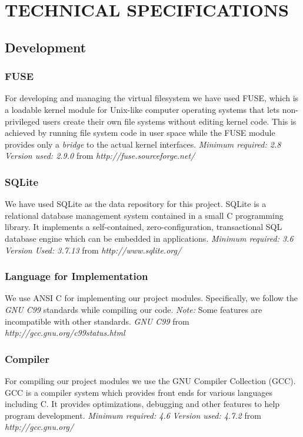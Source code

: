 \chapter {TECHNICAL SPECIFICATIONS}
\section {Development}
\subsection {FUSE}
For developing and managing the virtual filesystem we have used FUSE, which is a loadable kernel module for Unix-like computer operating systems that lets non-privileged users create their own file systems without editing kernel code. This is achieved by running file system code in user space while the FUSE module provides only a \textit{bridge} to the actual kernel interfaces. \newline
\emph{Minimum required: 2.8} \newline
\emph{Version used: 2.9.0} from \emph{http://fuse.sourceforge.net/}

\subsection {SQLite}
We have used SQLite as the data repository for this project. SQLite is a relational database management system contained in a small C programming library. It implements a self-contained, zero-configuration, transactional SQL database engine which can be embedded in applications. \newline
\emph{Minimum required: 3.6} \newline
\emph{Version Used: 3.7.13} from \emph{http://www.sqlite.org/}

\subsection {Language for Implementation}
We use ANSI C for implementing our project modules. Specifically, we follow the \textit{GNU C99} standards while compiling our code. \emph{Note:} Some features are incompatible with other standards. \newline
\emph{GNU C99} from \emph{http://gcc.gnu.org/c99status.html}

\subsection {Compiler}
For compiling our project modules we use the GNU Compiler Collection (GCC). GCC is a compiler system which provides front ends for various languages including C. It provides optimizations, debugging and other features to help program development. \newline
\emph{Minimum required: 4.6} \newline
\emph{Version used: 4.7.2} from \emph{http://gcc.gnu.org/}

